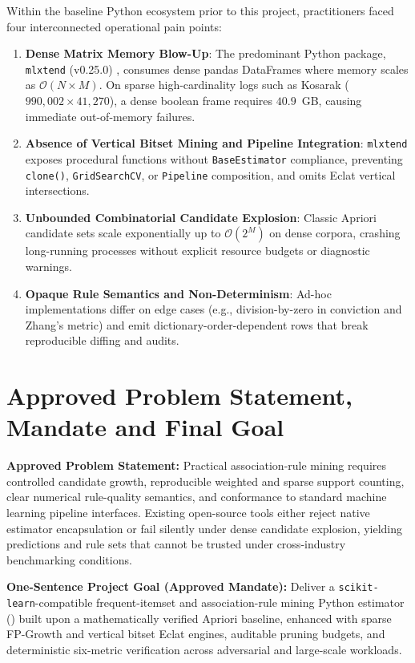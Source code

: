 Within the baseline Python ecosystem prior to this project, practitioners faced four interconnected operational pain points:
\begin{enumerate}
  \item \textbf{Dense Matrix Memory Blow-Up}: The predominant Python package, \texttt{mlxtend} (v0.25.0) \cite{mlxtend}, consumes dense pandas DataFrames where memory scales as $\mathcal{O}(N \times M)$. On sparse high-cardinality logs such as Kosarak ($990{,}002 \times 41{,}270$), a dense boolean frame requires $40.9$~GB, causing immediate out-of-memory failures.
  \item \textbf{Absence of Vertical Bitset Mining and Pipeline Integration}: \texttt{mlxtend} exposes procedural functions without \texttt{BaseEstimator} compliance, preventing \texttt{clone()}, \texttt{GridSearchCV}, or \texttt{Pipeline} composition, and omits Eclat vertical intersections.
  \item \textbf{Unbounded Combinatorial Candidate Explosion}: Classic Apriori candidate sets scale exponentially up to $\mathcal{O}(2^M)$ on dense corpora, crashing long-running processes without explicit resource budgets or diagnostic warnings.
  \item \textbf{Opaque Rule Semantics and Non-Determinism}: Ad-hoc implementations differ on edge cases (e.g., division-by-zero in conviction and Zhang's metric) and emit dictionary-order-dependent rows that break reproducible diffing and audits.
\end{enumerate}

\section{Approved Problem Statement, Mandate and Final Goal}
\textbf{Approved Problem Statement:} Practical association-rule mining requires controlled candidate growth, reproducible weighted and sparse support counting, clear numerical rule-quality semantics, and conformance to standard machine learning pipeline interfaces. Existing open-source tools either reject native estimator encapsulation or fail silently under dense candidate explosion, yielding predictions and rule sets that cannot be trusted under cross-industry benchmarking conditions.

\begin{klbox}[KLDarkBlue]
\textbf{One-Sentence Project Goal (Approved Mandate):} Deliver a \texttt{scikit-learn}-compatible frequent-itemset and association-rule mining Python estimator (\skarm) built upon a mathematically verified Apriori baseline, enhanced with sparse FP-Growth and vertical bitset Eclat engines, auditable pruning budgets, and deterministic six-metric verification across adversarial and large-scale workloads.
\end{klbox}

